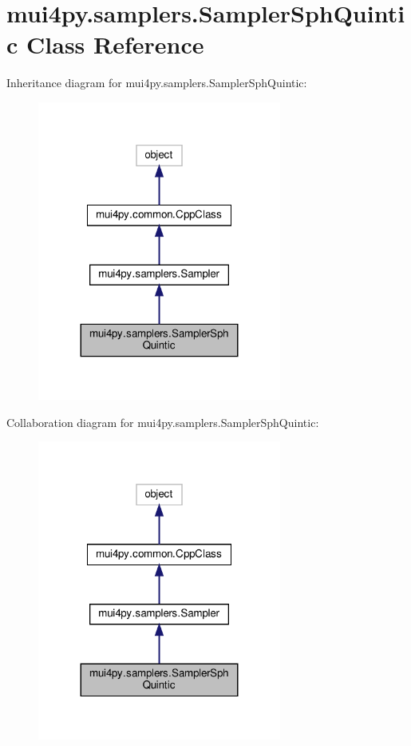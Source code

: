 \hypertarget{classmui4py_1_1samplers_1_1_sampler_sph_quintic}{}\section{mui4py.\+samplers.\+Sampler\+Sph\+Quintic Class Reference}
\label{classmui4py_1_1samplers_1_1_sampler_sph_quintic}


Inheritance diagram for mui4py.\+samplers.\+Sampler\+Sph\+Quintic\+:
\nopagebreak
\begin{figure}[H]
\begin{center}
\leavevmode
\includegraphics[width=227pt]{classmui4py_1_1samplers_1_1_sampler_sph_quintic__inherit__graph}
\end{center}
\end{figure}


Collaboration diagram for mui4py.\+samplers.\+Sampler\+Sph\+Quintic\+:
\nopagebreak
\begin{figure}[H]
\begin{center}
\leavevmode
\includegraphics[width=227pt]{classmui4py_1_1samplers_1_1_sampler_sph_quintic__coll__graph}
\end{center}
\end{figure}
